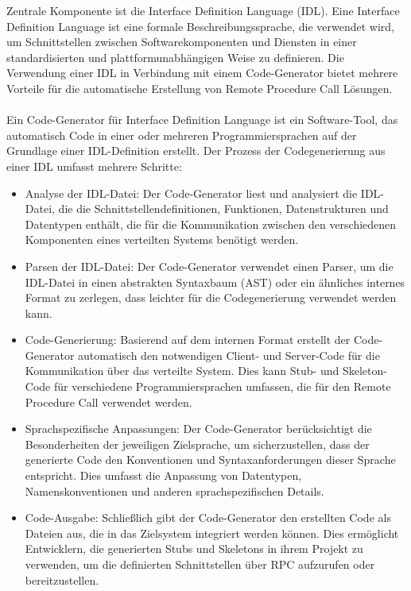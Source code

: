 \documentclass[../vs-script-first-v01.tex]{subfiles}
\begin{document}
Zentrale Komponente ist die  Interface Definition Language (IDL). Eine Interface Definition Language ist eine formale Beschreibungssprache, die verwendet wird, um Schnittstellen zwischen Softwarekomponenten und Diensten in einer standardisierten und plattformunabhängigen Weise zu definieren. Die Verwendung einer IDL in Verbindung mit einem Code-Generator bietet mehrere Vorteile für die automatische Erstellung von Remote Procedure Call Lösungen.
\\\\
Ein Code-Generator für Interface Definition Language ist ein Software-Tool, das automatisch Code in einer oder mehreren Programmiersprachen auf der Grundlage einer IDL-Definition erstellt. Der Prozess der Codegenerierung aus einer IDL umfasst mehrere Schritte:
\begin{itemize} 
\item Analyse der IDL-Datei: Der Code-Generator liest und analysiert die IDL-Datei, die die Schnittstellendefinitionen, Funktionen, Datenstrukturen und Datentypen enthält, die für die Kommunikation zwischen den verschiedenen Komponenten eines verteilten Systems benötigt werden.
\item Parsen der IDL-Datei: Der Code-Generator verwendet einen Parser, um die IDL-Datei in einen abstrakten Syntaxbaum (AST) oder ein ähnliches internes Format zu zerlegen, dass leichter für die Codegenerierung verwendet werden kann.
\item Code-Generierung: Basierend auf dem internen Format erstellt der Code-Generator automatisch den notwendigen Client- und Server-Code für die Kommunikation über das verteilte System. Dies kann Stub- und Skeleton-Code für verschiedene Programmiersprachen umfassen, die für den Remote Procedure Call verwendet werden.
\item Sprachspezifische Anpassungen: Der Code-Generator berücksichtigt die Besonderheiten der jeweiligen Zielsprache, um sicherzustellen, dass der generierte Code den Konventionen und Syntaxanforderungen dieser Sprache entspricht. Dies umfasst die Anpassung von Datentypen, Namenskonventionen und anderen sprachspezifischen Details.
\item Code-Ausgabe: Schließlich gibt der Code-Generator den erstellten Code als Dateien aus, die in das Zielsystem integriert werden können. Dies ermöglicht Entwicklern, die generierten Stubs und Skeletons in ihrem Projekt zu verwenden, um die definierten Schnittstellen über RPC aufzurufen oder bereitzustellen.
\end{itemize} 
\end{document}
